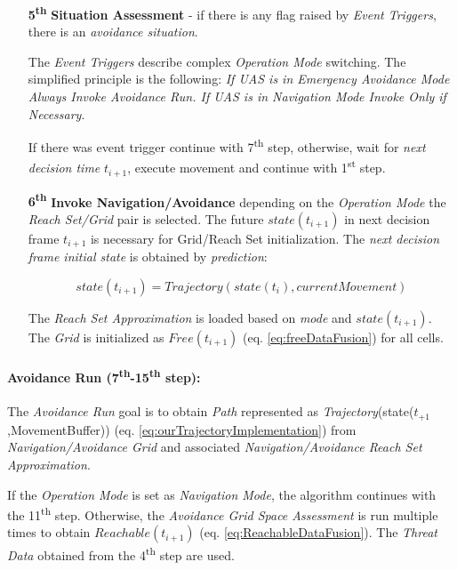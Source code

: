 \begin{itemize}
    \item[\textbf{5\textsuperscript{th}}] \textbf{Situation Assessment} - if there is any flag raised by \emph{Event Triggers}, there is an \emph{avoidance situation}.
    
    The \emph{Event Triggers} describe complex \emph{Operation Mode} switching. The simplified principle is the following: \emph{If UAS is in Emergency Avoidance Mode Always Invoke Avoidance Run. If UAS is in Navigation Mode Invoke Only if Necessary}.
    
    If there was event trigger continue with 7\textsuperscript{th} step, otherwise, wait for \emph{next decision time} $t_{i+1}$, execute movement and continue with 1\textsuperscript{st} step.
    
    \item[\textbf{6\textsuperscript{th}}] \textbf{Invoke Navigation/Avoidance} depending on the \emph{Operation Mode} the \emph{Reach Set/Grid} pair is selected. The future $state(t_{i+1})$ in next decision frame $t_{i+1}$ is necessary for Grid/Reach Set initialization. The \emph{next decision frame initial state} is obtained by \emph{prediction}:
    
    \begin{equation*}
        state(t_{i+1}) =  Trajectory(state(t_i),current Movement)
    \end{equation*}
    
    The \emph{Reach Set Approximation} is loaded based on \emph{mode} and $state(t_{i+1})$. The \emph{Grid} is initialized as $Free(t_{i+1})$ (eq. \ref{eq:freeDataFusion}) for all cells.
\end{itemize}



\paragraph{Avoidance Run (7\textsuperscript{th}-15\textsuperscript{th} step):} The \emph{Avoidance Run} goal is to obtain \emph{Path} represented as \emph{Trajectory}(state($t_{+1}$,MovementBuffer)) (eq. \ref{eq:ourTrajectoryImplementation}) from \emph{Navigation/Avoidance Grid} and associated \emph{Navigation/Avoidance Reach Set Approximation}.

If the \emph{Operation Mode} is set as \emph{Navigation Mode}, the algorithm continues with the 11\textsuperscript{th} step. Otherwise, the \emph{Avoidance Grid Space Assessment} is run multiple times to obtain $Reachable(t_{i+1})$ (eq. \ref{eq:ReachableDataFusion}). The \emph{Threat Data} obtained from the 4\textsuperscript{th} step are used. 

